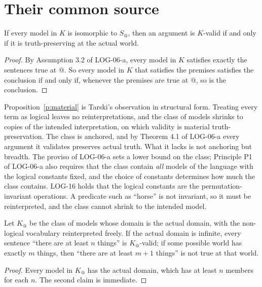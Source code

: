 \documentclass{situationist-preprint}
\begin{document}
\section{Their common source}

\begin{proposition}\label{p:material}
If every model in $K$ is isomorphic to $S_@$, then an argument is $K$-valid if and only if it is truth-preserving at the actual world.
\end{proposition}

\begin{proof}
By Assumption 3.2 of LOG-06-a, every model in $K$ satisfies exactly the sentences true at $@$. So every model in $K$ that satisfies the premises satisfies the conclusion if and only if, whenever the premises are true at $@$, so is the conclusion.
\end{proof}

Proposition~\ref{p:material} is Tarski's observation in structural form. Treating every term as logical leaves no reinterpretations, and the class of models shrinks to copies of the intended interpretation, on which validity is material truth-preservation. The class is anchored, and by Theorem 4.1 of LOG-06-a every argument it validates preserves actual truth. What it lacks is not anchoring but breadth. The proviso of LOG-06-a sets a lower bound on the class; Principle P1 of LOG-06-a also requires that the class contain \emph{all} models of the language with the logical constants fixed, and the choice of constants determines how much the class contains. LOG-16 holds that the logical constants are the permutation-invariant operations. A predicate such as \enquote{horse} is not invariant, so it must be reinterpreted, and the class cannot shrink to the intended model.

\begin{proposition}\label{p:fixed}
Let $K_@$ be the class of models whose domain is the actual domain, with the non-logical vocabulary reinterpreted freely. If the actual domain is infinite, every sentence \enquote{there are at least $n$ things} is $K_@$-valid; if some possible world has exactly $m$ things, then \enquote{there are at least $m+1$ things} is not true at that world.
\end{proposition}

\begin{proof}
Every model in $K_@$ has the actual domain, which has at least $n$ members for each $n$. The second claim is immediate.
\end{proof}
\end{document}
